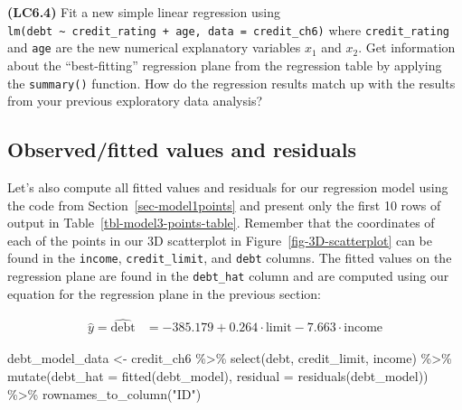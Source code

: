 \documentclass[
  letterpaper,
  DIV=11,
  numbers=noendperiod]{scrreprt}
\newenvironment{Shaded}{\begin{snugshade}}{\end{snugshade}}
\newcommand{\AttributeTok}[1]{\textcolor[rgb]{0.40,0.45,0.13}{#1}}
\newcommand{\FunctionTok}[1]{\textcolor[rgb]{0.28,0.35,0.67}{#1}}
\newcommand{\NormalTok}[1]{\textcolor[rgb]{0.00,0.23,0.31}{#1}}
\newcommand{\OtherTok}[1]{\textcolor[rgb]{0.00,0.23,0.31}{#1}}
\newcommand{\SpecialCharTok}[1]{\textcolor[rgb]{0.37,0.37,0.37}{#1}}
\newcommand{\StringTok}[1]{\textcolor[rgb]{0.13,0.47,0.30}{#1}}
\theoremstyle{definition}
\theoremstyle{remark}
\begin{document}
\begin{tcolorbox}[enhanced jigsaw, colback=white, toprule=.15mm, bottomrule=.15mm, titlerule=0mm, title={{🎯} Learning Check 6.3}, leftrule=.75mm, arc=.35mm, left=2mm, colframe=quarto-callout-tip-color-frame, coltitle=black, opacitybacktitle=0.6, bottomtitle=1mm, colbacktitle=quarto-callout-tip-color!10!white, opacityback=0, toptitle=1mm, rightrule=.15mm, breakable]

\textbf{(LC6.4)} Fit a new simple linear regression using
\texttt{lm(debt\ \textasciitilde{}\ credit\_rating\ +\ age,\ data\ =\ credit\_ch6)}
where \texttt{credit\_rating} and \texttt{age} are the new numerical
explanatory variables \(x_1\) and \(x_2\). Get information about the
``best-fitting'' regression plane from the regression table by applying
the \texttt{summary()} function. How do the regression results match up
with the results from your previous exploratory data analysis?

\end{tcolorbox}

\hypertarget{sec-model3points}{%
\subsection{Observed/fitted values and
residuals}\label{sec-model3points}}

Let's also compute all fitted values and residuals for our regression
model using the code from Section~\ref{sec-model1points} and present
only the first 10 rows of output in Table~\ref{tbl-model3-points-table}.
Remember that the coordinates of each of the points in our 3D
scatterplot in Figure~\ref{fig-3D-scatterplot} can be found in the
\texttt{income}, \texttt{credit\_limit}, and \texttt{debt} columns. The
fitted values on the regression plane are found in the
\texttt{debt\_hat} column and are computed using our equation for the
regression plane in the previous section:

\[
\begin{aligned}
\widehat{y} = \widehat{\text{debt}} &= -385.179 + 0.264 \cdot \text{limit} - 7.663 \cdot \text{income}
\end{aligned}
\]

\begin{Shaded}
\begin{Highlighting}[]
\NormalTok{debt\_model\_data }\OtherTok{\textless{}{-}}\NormalTok{ credit\_ch6 }\SpecialCharTok{\%\textgreater{}\%} 
  \FunctionTok{select}\NormalTok{(debt, credit\_limit, income) }\SpecialCharTok{\%\textgreater{}\%} 
  \FunctionTok{mutate}\NormalTok{(}\AttributeTok{debt\_hat =} \FunctionTok{fitted}\NormalTok{(debt\_model),}
         \AttributeTok{residual =} \FunctionTok{residuals}\NormalTok{(debt\_model)) }\SpecialCharTok{\%\textgreater{}\%} 
  \FunctionTok{rownames\_to\_column}\NormalTok{(}\StringTok{"ID"}\NormalTok{)}
\end{Highlighting}
\end{Shaded}
\end{document}
